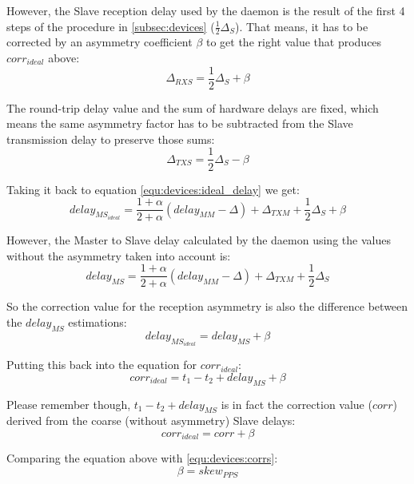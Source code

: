 However, the Slave reception delay used by the daemon is the result of the first
4 steps of the procedure in \ref{subsec:devices} ($\frac{1}{2}\Delta_S$). That means,
it has to be corrected by an asymmetry coefficient $\beta$ to get the right 
value that produces $corr_{ideal}$ above:
\begin{equation}
	\label{equ:devices:delta_rxs}
	\Delta_{RXS} = \frac{1}{2}\Delta_S + \beta
\end{equation}

The round-trip delay value and the sum of hardware delays are fixed,
which means the same asymmetry factor has to be subtracted from the Slave
transmission delay to preserve those sums:
\begin{equation}
	\label{equ:devices:delta_txs}
	\Delta_{TXS} = \frac{1}{2}\Delta_S - \beta
\end{equation}

\noindent Taking it back to equation \ref{equ:devices:ideal_delay} we get:
\begin{equation}
	delay_{MS_{ideal}} = \frac{1+\alpha}{2+\alpha}(delay_{MM} - \Delta) + 
	\Delta_{TXM} + \frac{1}{2}\Delta_S + \beta
\end{equation}

However, the Master to Slave delay calculated by the daemon using the values without
the asymmetry taken into account is:
\begin{equation}
	delay_{MS} = \frac{1+\alpha}{2+\alpha}(delay_{MM} - \Delta) + 
	\Delta_{TXM} + \frac{1}{2}\Delta_S
\end{equation}

So the correction value for the reception asymmetry is also the difference
between the $delay_{MS}$ estimations:
\begin{equation}
	delay_{MS_{ideal}} = delay_{MS} + \beta
\end{equation}

\noindent Putting this back into the equation for $corr_{ideal}$:
\begin{equation}
	corr_{ideal} = t_1 - t_2 + delay_{MS} + \beta
\end{equation}

\noindent Please remember though, $t_1 - t_2 + delay_{MS}$ is in fact the correction
value ($corr$) derived from the coarse (without asymmetry) Slave delays:
\begin{equation}
	corr_{ideal} = corr + \beta
\end{equation}

Comparing the equation above with \ref{equ:devices:corrs}:
\begin{equation}
	\beta = skew_{PPS}
\end{equation}

